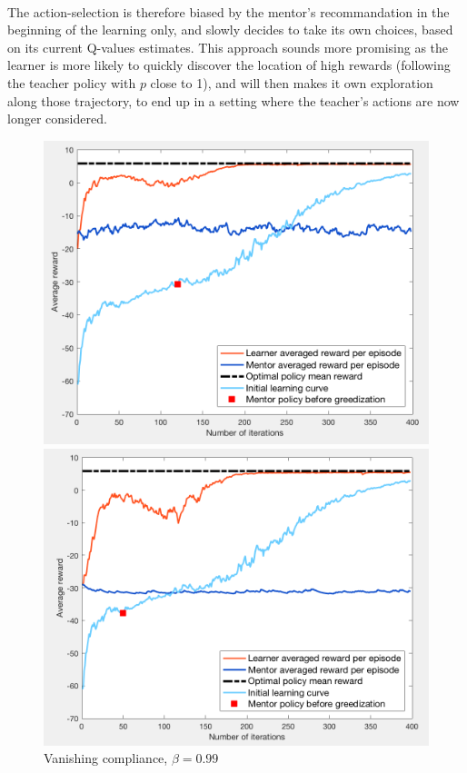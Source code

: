 \documentclass[a4paper]{report}
\begin{document}
{{{{			\paragraph{} The action-selection is therefore biased by the mentor's recommandation in the beginning of the learning only, and slowly decides to take its own choices, based on its current Q-values estimates. This approach sounds more promising as the learner is more likely to quickly discover the location of high rewards (following the teacher policy with $p$ close to 1), and will then makes it own exploration along those trajectory, to end up in a setting where the teacher's actions are now longer considered. 
		
			\begin{figure}[ht!]
				\begin{minipage}{0.5\linewidth}
					\begin{center}
						\includegraphics[width=0.95\linewidth]{comp_naive_compliance_120}
						\caption{Vanishing compliance, $\beta = 0.99$}
						\label{fig::comp_naive_compliance_120}
					\end{center}
				\end{minipage}
				\begin{minipage}{0.5\linewidth}
					\begin{center}
						\includegraphics[width=0.95\linewidth]{comp_naive_compliance_50}

\end{center}
\end{minipage}
\end{figure}}}}}
\end{document}
